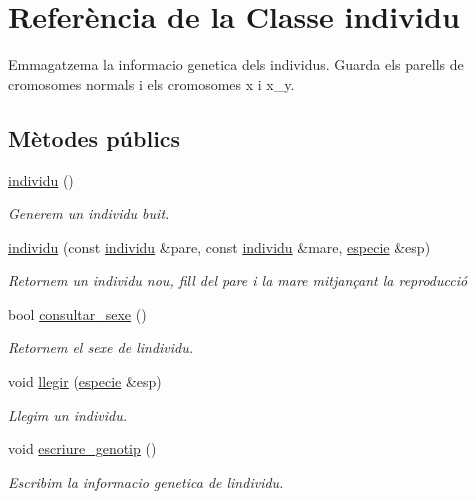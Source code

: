 \hypertarget{classindividu}{}\section{Referència de la Classe individu}
\label{classindividu}


Emmagatzema la informacio genetica dels individus. Guarda els parells de cromosomes normals i els cromosomes x i x\+\_\+y.  


\subsection*{Mètodes públics}
\begin{DoxyCompactItemize}
\item 
\hyperlink{classindividu_af1ba9dc86a04bff6b41ed2d1cf3202b9}{individu} ()
\begin{DoxyCompactList}\small\item\em Generem un individu buit. \end{DoxyCompactList}\item 
\hyperlink{classindividu_a391c6415dd94b28819ba19f07acac69b}{individu} (const \hyperlink{classindividu}{individu} \&pare, const \hyperlink{classindividu}{individu} \&mare, \hyperlink{classespecie}{especie} \&esp)
\begin{DoxyCompactList}\small\item\em Retornem un individu nou, fill del pare i la mare mitjançant la reproducció \end{DoxyCompactList}\item 
bool \hyperlink{classindividu_a30ab21dfd66b20a748bcf41e0b3108a0}{consultar\+\_\+sexe} ()
\begin{DoxyCompactList}\small\item\em Retornem el sexe de l\textquotesingle{}individu. \end{DoxyCompactList}\item 
void \hyperlink{classindividu_a6cfcb4f2472be86eb3416da90dc721be}{llegir} (\hyperlink{classespecie}{especie} \&esp)
\begin{DoxyCompactList}\small\item\em Llegim un individu. \end{DoxyCompactList}\item 
void \hyperlink{classindividu_a8e9d5b4698e9d2d1838e5a512206768a}{escriure\+\_\+genotip} ()
\begin{DoxyCompactList}\small\item\em Escribim la informacio genetica de l\textquotesingle{}individu. \end{DoxyCompactList}\end{DoxyCompactItemize}
